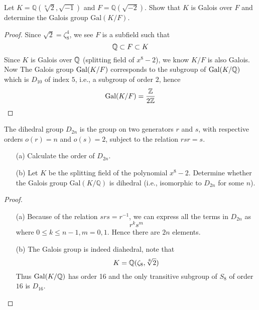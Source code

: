 \begin{prob}[F2010-Q3]
    Let \(K = \mathbb{Q}(\sqrt[8]{2}, \sqrt{-1})\) and \(F = \mathbb{Q}(\sqrt{-2})\). Show that \(K\) is Galois over \(F\) and determine the Galois group \(\text{Gal}(K/F)\).
\end{prob}
\begin{proof}
    Since $\sqrt{2}=\zeta_8^4$, we see $F$ is a subfield such that 
    \begin{equation*}
        \mathbb{Q}\subset F\subset K
    \end{equation*}
    Since $K$ is Galois over $\mathbb{Q}$ (splitting field of $x^8-2$), we know $K/F$ is also Galois. Now The Galois group $\text{Gal}(K/F)$ corresponds to the subgroup of $\text{Gal}(K/\mathbb{Q})$ which is $D_{10}$ of index $5$, i.e., a subgroup of order $2$, hence 
    \begin{equation*}
        \text{Gal}(K/F)=\frac{\mathbb{Z}}{2\mathbb{Z}}
    \end{equation*} 


\end{proof}

\begin{prob}[F2015-Q2]
    The dihedral group \(D_{2n}\) is the group on two generators \(r\) and \(s\), with respective orders \(o(r)=n\) and \(o(s)=2\), subject to the relation \(rsr=s\).
    \begin{itemize}
        \item[(a)] Calculate the order of \(D_{2n}\).
        \item[(b)] Let \(K\) be the splitting field of the polynomial \(x^8 - 2\). Determine whether the Galois group \(\text{Gal}(K/\mathbb{Q})\) is dihedral (i.e., isomorphic to \(D_{2n}\) for some \(n\)).
    \end{itemize}
\end{prob}
\begin{proof}
    \begin{itemize}
        \item[(a)] Because of the relation $srs=r^{-1}$, we can express all the terms in $D_{2n}$ as 
        \begin{equation*}
            r^ks^m
        \end{equation*}
        where $0\leq k\leq n-1, m=0,1$. Hence there are $2n$ elements.
        \item[(b)] The Galois group is indeed diahedral, note that 
        \begin{equation*}
            K=\mathbb{Q}(\zeta_8,\sqrt[8]{2})
        \end{equation*}
        Thus $\text{Gal}(K/\mathbb{Q})$ has order 16 and the only transitive subgroup of $S_8$ of order $16$ is $D_{16}$.
    \end{itemize}
\end{proof}


